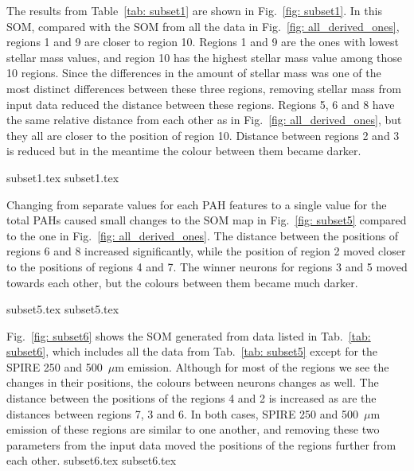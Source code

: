             The results from Table~\ref{tab: subset1} are shown in Fig.~\ref{fig: subset1}. 
            In this SOM, compared with the SOM from all the data in Fig.~\ref{fig: all_derived_ones}, regions 1 and 9 are closer to region 10. 
            Regions 1 and 9 are the ones with lowest stellar mass values, and region 10 has the highest stellar mass value among those 10 regions. 
            Since the differences in the amount of stellar mass was one of the most distinct differences between these three regions, removing stellar mass from input data reduced the distance between these regions.
            Regions 5, 6 and 8 have the same relative distance from each other as in Fig.~\ref{fig: all_derived_ones}, but they all are closer to the position of region 10.
            Distance between regions 2 and 3 is reduced but in the meantime the colour between them became darker.

            {subset1.tex}
            {subset1.tex}

            Changing from separate values for each PAH features to a single value for the total PAHs caused small changes to the SOM map in Fig.~\ref{fig: subset5} compared to the one in Fig.~\ref{fig: all_derived_ones}. 
            The distance between the positions of regions 6 and 8 increased significantly, while the position of region 2 moved closer to the positions of regions 4 and 7.
            The winner neurons for regions 3 and 5 moved towards each other, but the colours between them became much darker. 

            {subset5.tex}
            {subset5.tex}

            Fig.~\ref{fig: subset6} shows the SOM generated from data listed in Tab.~\ref{tab: subset6}, which includes all the data from Tab.~\ref{tab: subset5} except for  the SPIRE 250 and 500~$\mu$m emission.
            Although for most of the regions we see the changes in their positions, the colours between neurons changes as well. 
            The distance between the positions of the regions 4 and 2 is increased as are the
            distances between regions 7, 3 and 6.
            In both cases, SPIRE 250 and 500~$\mu$m emission of these regions are similar to one another, and removing these two parameters from the input data moved the positions of the regions further from each other. 
            {subset6.tex}
            {subset6.tex}
            
